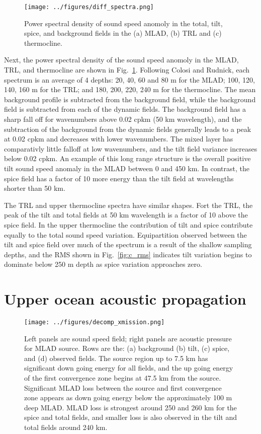\documentclass[preprint,NumberedRefs]{JASA}
\begin{document}
\begin{figure}
\texttt{[image: ../figures/diff\_spectra.png]}
        \caption{\label{fig:spectra}{Power spectral density of sound speed anomoly in the total, tilt, spice, and background fields in the (a) MLAD, (b) TRL and (c) thermocline.}}
\end{figure}
Next, the power spectral density of the sound speed anomoly in the MLAD, TRL, and thermocline are shown in Fig.~\ref{fig:spectra}. Following Colosi and Rudnick\cite{colosi2020observations}, each spectrum is an average of 4 depths: 20, 40, 60 and 80 m for the MLAD; 100, 120, 140, 160 m for the TRL; and 180, 200, 220, 240 m for the thermocline. The mean background profile is subtracted from the background field, while the background field is subtracted from each of the dynamic fields. The background field has a sharp fall off for wavenumbers above 0.02 cpkm (50 km wavelength), and the subtraction of the background from the dynamic fields generally leads to a peak at 0.02 cpkm and decreases with lower wavenumbers. The mixed layer has comparativly little falloff at low wavenumbers, and the tilt field variance increases below 0.02 cpkm. An example of this long range structure is the overall positive tilt sound speed anomaly in the MLAD between 0 and 450 km. In contrast, the spice field has a factor of 10 more energy than the tilt field at wavelengths shorter than 50 km.

The TRL and upper thermocline spectra have similar shapes. Fort the TRL, the peak of the tilt and total fields at 50 km wavelength is a factor of 10 above the spice field. In the upper thermocline the contribution of tilt and spice contribute equally to the total sound speed variation. Equipartition observed between the tilt and spice field over much of the spectrum is a result of the shallow sampling depths, and the RMS shown in Fig.~\ref{fig:c_rms} indicates tilt variation begins to dominate below 250 m depth as spice variation approaches zero.

\section{\label{sec:propagation}Upper ocean acoustic propagation}
\begin{figure}
\texttt{[image: ../figures/decomp\_xmission.png]}
    \caption{\label{fig:decomp_x}{Left panels are sound speed field; right panels are acoustic pressure for MLAD source. Rows are the: (a) background (b) tilt, (c) spice, and (d) observed fields. The source region up to 7.5 km has significant down going energy for all fields, and the up going energy of the first convergence zone begins at 47.5 km from the source. Significant MLAD loss between the source and first convergence zone appears as down going energy below the approximately 100 m deep MLAD. MLAD loss is strongest around 250 and 260 km for the spice and total fields, and smaller loss is also observed in the tilt and total fields around 240 km.}}
\end{figure}
\end{document}
